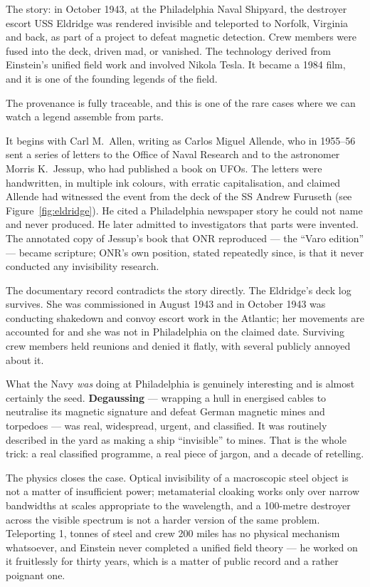 The story: in October 1943, at the Philadelphia Naval Shipyard, the destroyer escort USS Eldridge
was rendered invisible and teleported to Norfolk, Virginia and back, as part of a project to
defeat magnetic detection. Crew members were fused into the deck, driven mad, or vanished. The
technology derived from Einstein's unified field work and involved Nikola Tesla. It became a
1984 film, and it is one of the founding legends of the field.

The provenance is fully traceable, and this is one of the rare cases where we can watch a legend
assemble from parts.

It begins with Carl M.~Allen, writing as Carlos Miguel Allende, who in 1955--56 sent a series of
letters to the Office of Naval Research and to the astronomer Morris K.~Jessup, who had published
a book on UFOs. The letters were handwritten, in multiple ink colours, with erratic
capitalisation, and claimed Allende had witnessed the event from the deck of the SS Andrew Furuseth (see Figure~\ref{fig:eldridge}). He cited a Philadelphia newspaper story he could not name and never produced. He later
admitted to investigators that parts were invented. The annotated copy of Jessup's book that ONR
reproduced --- the ``Varo edition'' --- became scripture; ONR's own position, stated repeatedly
since, is that it never conducted any invisibility research.

The documentary record contradicts the story directly. The Eldridge's deck log survives. She was
commissioned in August 1943 and in October 1943 was conducting shakedown and convoy escort work
in the Atlantic; her movements are accounted for and she was not in Philadelphia on the claimed
date. Surviving crew members held reunions and denied it flatly, with several publicly annoyed
about it.

What the Navy \emph{was} doing at Philadelphia is genuinely interesting and is almost certainly
the seed. \textbf{Degaussing} --- wrapping a hull in energised cables to neutralise its magnetic
signature and defeat German magnetic mines and torpedoes --- was real, widespread, urgent, and
classified. It was routinely described in the yard as making a ship ``invisible'' to mines. That
is the whole trick: a real classified programme, a real piece of jargon, and a decade of
retelling.

The physics closes the case. Optical invisibility of a macroscopic steel object is not a matter
of insufficient power; metamaterial cloaking works only over narrow bandwidths at scales
appropriate to the wavelength, and a 100-metre destroyer across the visible spectrum is not a
harder version of the same problem. Teleporting 1, tonnes of steel and crew 200 miles has no
physical mechanism whatsoever, and Einstein never completed a unified field theory --- he worked
on it fruitlessly for thirty years, which is a matter of public record and a rather poignant one.

